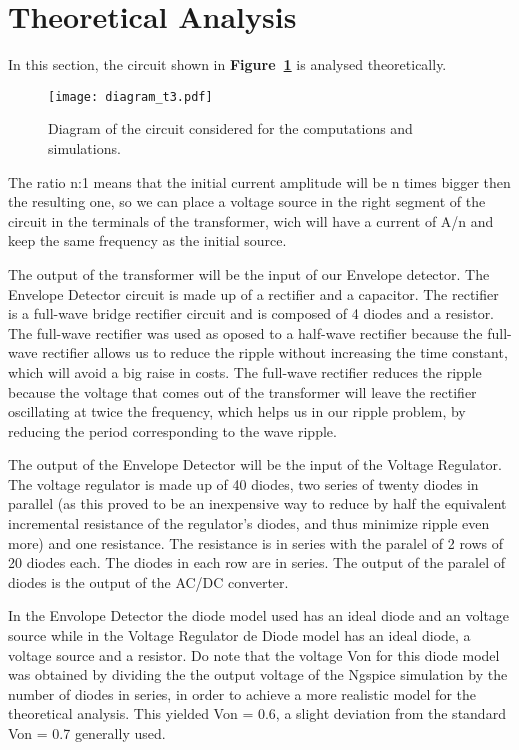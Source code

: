 \section{Theoretical Analysis}
\label{sec:analysis}

In this section, the circuit shown in \textbf{Figure~\ref{fig:diagram_t3}} is analysed
theoretically.
\begin{figure}[H] \centering
\texttt{[image: diagram\_t3.pdf]}
\vspace{-6cm}
\caption{Diagram of the circuit considered for the computations and simulations.}
\label{fig:diagram_t3}
\end{figure}

The ratio n:1 means that the initial current amplitude will be n times bigger then the resulting one, so we can place a voltage source in the right segment of the circuit in the terminals of the transformer, wich will have a current of A/n and keep the same frequency as the initial source.

The output of the transformer will be the input of our Envelope detector. The Envelope Detector circuit is made up of a rectifier and a capacitor. The rectifier is a full-wave bridge rectifier circuit and is composed of 4 diodes and a resistor. The full-wave rectifier was used as oposed to a half-wave rectifier because the full-wave rectifier allows us to reduce the ripple without increasing the time constant, which will avoid a big raise in costs. The full-wave rectifier reduces the ripple because the voltage that comes out of the transformer will leave the rectifier oscillating at twice the frequency, which helps us in our ripple problem, by reducing the period corresponding to the wave ripple.

The output of the Envelope Detector will be the input of the Voltage Regulator. The voltage regulator is made up of 40 diodes, two series of twenty diodes in parallel (as this proved to be an inexpensive way to reduce by half the equivalent incremental resistance of the regulator's diodes, and thus minimize ripple even more) and one resistance. The resistance is in series with the paralel of 2 rows of 20 diodes each. The diodes in each row are in series. The output of the paralel of diodes is the output of the AC/DC converter.

In the Envolope Detector the diode model used has an ideal diode and an voltage source while in the Voltage Regulator de Diode model has an ideal diode, a voltage source and a resistor. Do note that the voltage Von for this diode model was obtained by dividing the the output voltage of the Ngspice simulation by the number of diodes in series, in order to achieve a more realistic model for the theoretical analysis. This yielded Von = 0.6, a slight deviation from the standard Von = 0.7 generally used.

